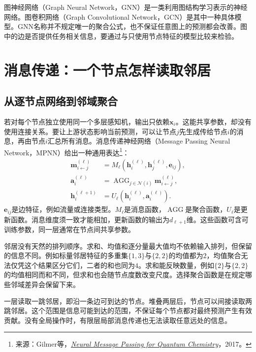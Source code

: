 图神经网络（Graph Neural Network，GNN）是一类利用图结构学习表示的神经网络。图卷积网络（Graph Convolutional Network，GCN）是其中一种具体模型。GNN名称并不规定唯一的聚合公式，也不保证任意图上的预测都会改善。图中的边是否提供任务相关信息，要通过与只使用节点特征的模型比较来检验。

\section{消息传递：一个节点怎样读取邻居}
\subsection{从逐节点网络到邻域聚合}
若对每个节点独立使用同一个多层感知机，输出只依赖$\bm x_i$。这能共享参数，却没有使用连接关系。要让上游状态影响当前预测，可以让节点$j$先生成传给节点$i$的消息，再由节点$i$汇总所有消息。消息传递神经网络（Message Passing Neural Network，MPNN）给出一种通用表达\footnote{来源：Gilmer等，\href{https://arxiv.org/abs/1704.01212}{\textit{Neural Message Passing for Quantum Chemistry}}，2017。}：
\begin{align}
 \bm m_{i\leftarrow j}^{(\ell)}&=M_\ell(\bm h_i^{(\ell)},\bm h_j^{(\ell)},\bm e_{ij}),\label{eq:graph-message-function}\\
 \bm a_i^{(\ell)}&=\operatorname{AGG}_{j\in\mathcal N(i)}\bm m_{i\leftarrow j}^{(\ell)},\\
 \bm h_i^{(\ell+1)}&=U_\ell(\bm h_i^{(\ell)},\bm a_i^{(\ell)}).
 \label{eq:graph-message-passing}
\end{align}
$\bm e_{ij}$是边特征，例如流量或连接类型。$M_\ell$是消息函数，$\operatorname{AGG}$是聚合函数，$U_\ell$是更新函数。消息维度须一致才能相加，更新函数的输出为$d_{\ell+1}$维。这些函数可含可训练参数，同一层通常在节点间共享参数。

邻居没有天然的排列顺序。求和、均值和逐分量最大值均不依赖输入排列，但保留的信息不同。例如标量邻居特征的多重集$\{1,3\}$与$\{2,2\}$的均值都为$2$，均值聚合无法仅凭这个结果区分它们，二者的和也同为$4$。求和能反映数量，例如$\{2\}$与$\{2,2\}$的均值相同而和不同，但求和也会随节点度数改变尺度。选择聚合函数是在规定哪些邻域差异会保留下来。

一层读取一跳邻居，即沿一条边可到达的节点。堆叠两层后，节点可以间接读取两跳邻居。这个范围是信息可能到达的范围，不保证每个节点都对最终预测产生有效贡献。没有全局操作时，有限层局部消息传递也无法读取任意远处的信息。

